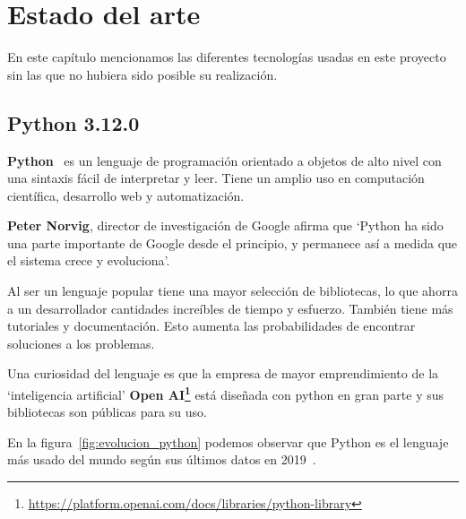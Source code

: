 \documentclass[a4paper, 12pt]{book}
\begin{document}

\cleardoublepage
\chapter{Estado del arte}
\label{chap:estado}
En este capítulo mencionamos las diferentes tecnologías  usadas en este proyecto sin las que no hubiera sido posible su realización.
 

\section{Python 3.12.0} 
\label{sec:python}
\textbf{Python}~\cite{oracle:_python} es un lenguaje de programación orientado a objetos de alto nivel con una sintaxis fácil de interpretar y leer. Tiene un amplio uso en computación científica, desarrollo web y automatización.

\textbf{Peter Norvig}, director de investigación de Google afirma que `Python ha sido una parte importante de Google desde el principio, y permanece así a medida que el sistema crece y evoluciona'.

Al ser un lenguaje popular tiene una mayor selección de bibliotecas, lo que ahorra a un desarrollador cantidades increíbles de tiempo y esfuerzo. También tiene más tutoriales y documentación. Esto aumenta las probabilidades de encontrar soluciones a los problemas.

Una curiosidad del lenguaje es que la empresa de mayor emprendimiento de la `inteligencia artificial'  \textbf{ Open AI\footnote{\url{https://platform.openai.com/docs/libraries/python-library}}} está diseñada con python en gran parte y sus bibliotecas son públicas para su uso.

En la figura~\ref{fig:evolucion_python} podemos observar que Python es el lenguaje más usado del mundo según sus últimos datos en 2019~\cite{statista:_tecnología}.
\end{document}
